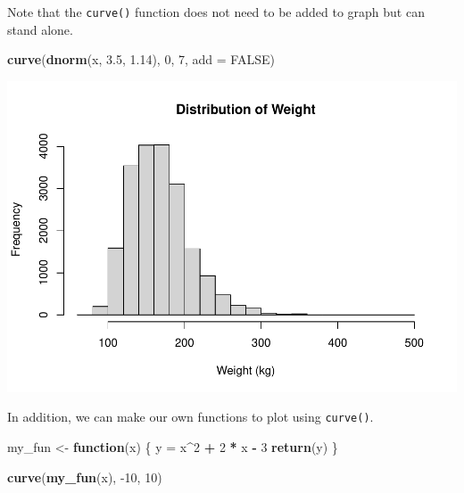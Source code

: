 \documentclass[
]{book}
\newenvironment{Shaded}{\begin{snugshade}}{\end{snugshade}}
\newcommand{\ControlFlowTok}[1]{\textcolor[rgb]{0.13,0.29,0.53}{\textbf{#1}}}
\newcommand{\DataTypeTok}[1]{\textcolor[rgb]{0.13,0.29,0.53}{#1}}
\newcommand{\DecValTok}[1]{\textcolor[rgb]{0.00,0.00,0.81}{#1}}
\newcommand{\FloatTok}[1]{\textcolor[rgb]{0.00,0.00,0.81}{#1}}
\newcommand{\KeywordTok}[1]{\textcolor[rgb]{0.13,0.29,0.53}{\textbf{#1}}}
\newcommand{\NormalTok}[1]{#1}
\newcommand{\OperatorTok}[1]{\textcolor[rgb]{0.81,0.36,0.00}{\textbf{#1}}}
\newcommand{\OtherTok}[1]{\textcolor[rgb]{0.56,0.35,0.01}{#1}}
\newcommand{\StringTok}[1]{\textcolor[rgb]{0.31,0.60,0.02}{#1}}
\begin{document}
Note that the \texttt{curve()} function does not need to be added to graph but can stand alone.

\begin{Shaded}
\begin{Highlighting}[]
\KeywordTok{curve}\NormalTok{(}\KeywordTok{dnorm}\NormalTok{(x, }\FloatTok{3.5}\NormalTok{, }\FloatTok{1.14}\NormalTok{), }\DecValTok{0}\NormalTok{, }\DecValTok{7}\NormalTok{, }\DataTypeTok{add =} \OtherTok{FALSE}\NormalTok{)}
\end{Highlighting}
\end{Shaded}

\includegraphics{_main_files/figure-latex/unnamed-chunk-224-1.pdf}

In addition, we can make our own functions to plot using \texttt{curve()}.

\begin{Shaded}
\begin{Highlighting}[]
\NormalTok{my_fun <-}\StringTok{ }\ControlFlowTok{function}\NormalTok{(x) \{}
\NormalTok{    y =}\StringTok{ }\NormalTok{x}\OperatorTok{^}\DecValTok{2} \OperatorTok{+}\StringTok{ }\DecValTok{2} \OperatorTok{*}\StringTok{ }\NormalTok{x }\OperatorTok{-}\StringTok{ }\DecValTok{3}
    \KeywordTok{return}\NormalTok{(y)}
\NormalTok{\}}

\KeywordTok{curve}\NormalTok{(}\KeywordTok{my_fun}\NormalTok{(x), }\DecValTok{-10}\NormalTok{, }\DecValTok{10}\NormalTok{)}
\end{Highlighting}
\end{Shaded}
\end{document}
